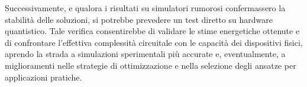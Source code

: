 Successivamente, e qualora i risultati su simulatori rumorosi confermassero la stabilità delle soluzioni, si potrebbe prevedere un test diretto su hardware quantistico. Tale verifica consentirebbe di validare le stime energetiche ottenute e di confrontare l’effettiva complessità circuitale con le capacità dei dispositivi fisici, aprendo la strada a simulazioni sperimentali più accurate e, eventualmente, a miglioramenti nelle strategie di ottimizzazione e nella selezione degli ansatze per applicazioni pratiche.
